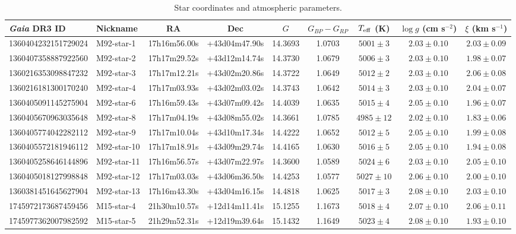 \begin{table}
\caption{Star coordinates and atmospheric parameters.}\label{tab:starcoords}
\begin{tabular}{llccccccc}
\toprule
{\it Gaia} DR3 ID & Nickname & RA & Dec & $G$ & $G_{BP} - G_{RP}$ & $T_{\rm eff}$ (K)\footnotemark[1] & $\log g$ (cm s$^{-2}$) & $\xi$ (km s$^{-1}$) \\ \midrule
1360404232151729024 & M92-star-1  & 17h16m56.00s & +43d04m47.90s & 14.3693 & 1.0703 & $5001 \pm 3$ & $2.03 \pm 0.10$ & $2.03 \pm 0.09$ \\ 
1360407358887922560 & M92-star-2  & 17h17m29.52s & +43d12m14.74s & 14.3730 & 1.0679 & $5006 \pm 3$ & $2.03 \pm 0.10$ & $1.98 \pm 0.07$ \\ 
1360216353098847232 & M92-star-3  & 17h17m12.21s & +43d02m20.86s & 14.3722 & 1.0649 & $5012 \pm 2$ & $2.03 \pm 0.10$ & $2.06 \pm 0.08$ \\ 
1360216181300170240 & M92-star-4  & 17h17m03.93s & +43d02m03.02s & 14.3743 & 1.0642 & $5014 \pm 3$ & $2.03 \pm 0.10$ & $2.04 \pm 0.07$ \\ 
1360405091145275904 & M92-star-6  & 17h16m59.43s & +43d07m09.42s & 14.4039 & 1.0635 & $5015 \pm 4$ & $2.05 \pm 0.10$ & $1.96 \pm 0.07$ \\ 
1360405670963035648 & M92-star-8  & 17h17m04.19s & +43d08m55.02s & 14.3661 & 1.0785 & $4985 \pm 12$ & $2.02 \pm 0.10$ & $1.83 \pm 0.06$ \\ 
1360405774042282112 & M92-star-9  & 17h17m10.04s & +43d10m17.34s & 14.4222 & 1.0652 & $5012 \pm 5$ & $2.05 \pm 0.10$ & $1.99 \pm 0.08$ \\ 
1360405572181946112 & M92-star-10 & 17h17m18.91s & +43d09m29.74s & 14.4165 & 1.0630 & $5016 \pm 5$ & $2.05 \pm 0.10$ & $1.94 \pm 0.08$ \\ 
1360405258646144896 & M92-star-11 & 17h16m56.57s & +43d07m22.97s & 14.3600 & 1.0589 & $5024 \pm 6$ & $2.03 \pm 0.10$ & $2.05 \pm 0.10$ \\ 
1360405018127998848 & M92-star-12 & 17h17m03.03s & +43d06m36.50s & 14.4253 & 1.0577 & $5027 \pm 10$ & $2.06 \pm 0.10$ & $2.00 \pm 0.10$ \\ 
1360381451645627904 & M92-star-13 & 17h16m43.30s & +43d04m16.15s & 14.4818 & 1.0625 & $5017 \pm 3$ & $2.08 \pm 0.10$ & $2.03 \pm 0.10$ \\ 
1745972173687459456 & M15-star-4  & 21h30m10.57s & +12d14m11.41s & 15.1255 & 1.1673 & $5018 \pm 4$ & $2.07 \pm 0.10$ & $2.06 \pm 0.11$ \\ 
1745977362007982592 & M15-star-5  & 21h29m52.31s & +12d19m39.64s & 15.1432 & 1.1649 & $5023 \pm 4$ & $2.08 \pm 0.10$ & $1.93 \pm 0.10$ \\ 

\end{tabular}
\end{table}
